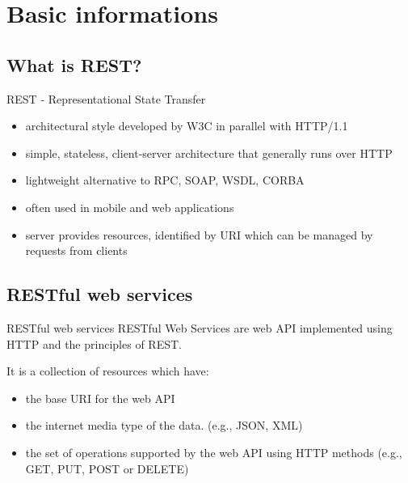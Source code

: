 \section{Basic informations}

\subsection{What is REST?}
	\begin{frame}{REST - Representational State Transfer}
		    	\begin{itemize}
				  \item architectural style developed by W3C in parallel with HTTP/1.1
				  \item simple, stateless, client-server architecture that generally runs over HTTP 
				  \item lightweight alternative to RPC, SOAP, WSDL, CORBA
				  \item often used in mobile and web applications
				  \item server provides resources, identified by URI which can be managed by requests from clients
				\end{itemize}
	\end{frame}
	
\subsection{RESTful web services} 
	
	\begin{frame}{RESTful web services}	
		RESTful Web Services are web API implemented using HTTP and the principles of REST.	
		
		\vspace{1cm}
		
		It is a collection of resources which have:
		\begin{itemize}
		  \item the base URI for the web API
		  \item the internet media type of the data. (e.g., JSON, XML)
		  \item the set of operations supported by the web API using HTTP methods (e.g., GET, PUT, POST or DELETE)
		\end{itemize}
	\end{frame}	
	

